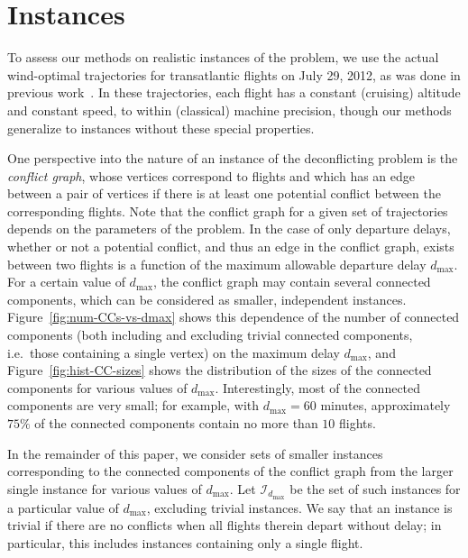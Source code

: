 \section{Instances}\label{sec:instances}
To assess our methods on realistic instances of the problem, we use the actual wind-optimal trajectories for transatlantic flights on July 29, 2012, as was done in previous work~\cite{rodionova16}.
In these trajectories, each flight has a constant (cruising) altitude 
and constant speed, to within (classical) machine precision,
though our methods generalize to instances without these special properties.

One perspective into the nature of an instance of the deconflicting problem is the \emph{conflict graph}, whose vertices correspond to flights and which has an edge between a pair of vertices if there is at least one potential conflict between the corresponding flights.
Note that the conflict graph for a given set of trajectories depends on the parameters of the problem.
In the case of only departure delays, whether or not a potential conflict, and thus an edge in the conflict graph, exists between two flights is a function of the maximum allowable departure delay $d_{\max}$.
For a certain value of $d_{\max}$, the conflict graph may contain several connected components, which can be considered as smaller, independent instances.
Figure~\ref{fig:num-CCs-vs-dmax} shows this dependence of the number of connected components (both including and excluding trivial connected components, i.e.\ those containing a single vertex) on the maximum delay $d_{\max}$,
and Figure~\ref{fig:hist-CC-sizes} shows the distribution of the sizes of the connected components for various values of $d_{\max}$.
Interestingly, 
most of the connected components are very small; for example, with $d_{\max}= 60$ minutes, approximately $75\%$ of the connected components contain no more than $10$ flights.

In the remainder of this paper, we consider sets of smaller instances corresponding to the connected components of the conflict graph from the larger single instance for various values of $d_{\max}$. 
Let $\mathcal I_{d_{\max}}$ be the set of such instances for a particular value of $d_{\max}$, excluding trivial instances.
We say that an instance is trivial if there are no conflicts when all flights therein depart without delay; in particular, this includes instances containing only a single flight.

